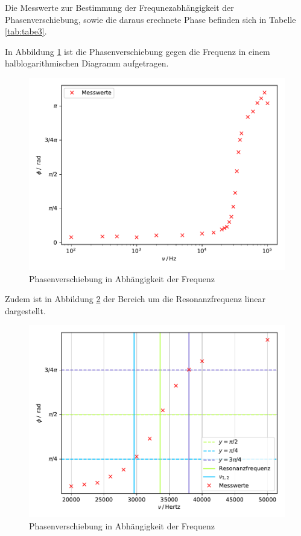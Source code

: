 Die Messwerte zur Bestimmung der Frequnezabhängigkeit der Phasenverschiebung,
sowie die daraus erechnete Phase befinden sich in Tabelle \ref{tab:tabe3}.


\noindent In Abbildung \ref{fig:phase} ist die Phasenverschiebung gegen die Frequenz
in einem halblogarithmischen Diagramm aufgetragen.

\begin{figure}[H]
  \centering
  \includegraphics{plot4.pdf}
  \caption{Phasenverschiebung in Abhängigkeit der Frequenz}
  \label{fig:phase}
\end{figure}

Zudem ist in Abbildung \ref{fig:plot4} der Bereich um die Resonanzfrequenz linear
dargestellt.

\begin{figure}[H]
  \centering
  \includegraphics{plot5.pdf}
  \caption{Phasenverschiebung in Abhängigkeit der Frequenz}
  \label{fig:plot4}
\end{figure}

